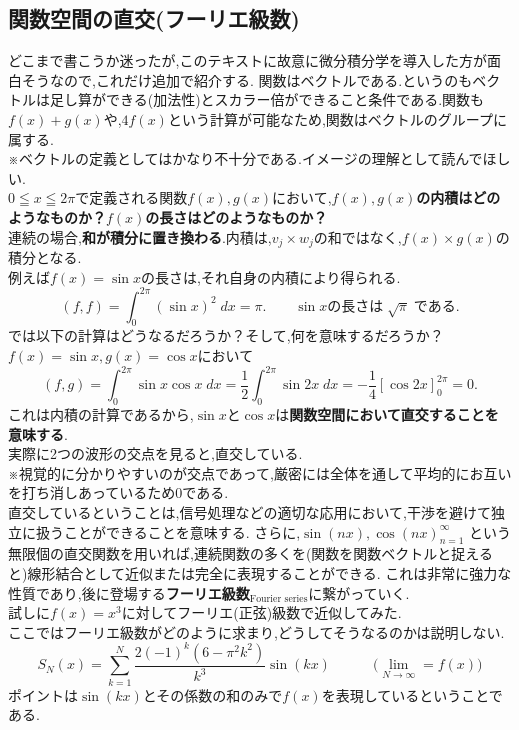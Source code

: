 \subsection{関数空間の直交(フーリエ級数)}
どこまで書こうか迷ったが,このテキストに故意に微分積分学を導入した方が面白そうなので,これだけ追加で紹介する.
関数はベクトルである.というのもベクトルは足し算ができる(加法性)とスカラー倍ができること条件である.関数も$f(x)+g(x)$や,$4f(x)$という計算が可能なため,関数はベクトルのグループに属する.\\
※ベクトルの定義としてはかなり不十分である.イメージの理解として読んでほしい.\\
$0\leqq x \leqq 2\pi$で定義される関数$f(x),g(x)$において,\textbf{$f(x),g(x)$の内積はどのようなものか？$f(x)$の長さはどのようなものか？}\\
連続の場合,\textbf{和が積分に置き換わる}.内積は,$v_j\times w_j$の和ではなく,$f(x)\times g(x)$の積分となる.\\
例えば$f(x)=\sin{x}$の長さは,それ自身の内積により得られる.
\[(f,f)=\int_{0}^{2\pi}(\sin{x})^2\;dx=\pi. \qquad\sin{x}\text{の長さは}\;\sqrt{\pi}\;\text{である.}\]
では以下の計算はどうなるだろうか？そして,何を意味するだろうか？\\
$f(x)=\sin{x},g(x)=\cos{x}$において
\[\displaystyle
(f,g)=\int_{0}^{2\pi}\sin{x}\cos{x}\;dx=\frac{1}{2}\int_{0}^{2\pi}\sin{2x}\;dx=-\frac{1}{4}\left[\cos{2x}\right]^{2\pi}_0=0.
\]
これは内積の計算であるから,$\sin{x}$と$\cos{x}$は\textbf{関数空間において直交することを意味する}.\\
実際に2つの波形の交点を見ると,直交している.\\
※視覚的に分かりやすいのが交点であって,厳密には全体を通して平均的にお互いを打ち消しあっているため0である.\\
直交しているということは,信号処理などの適切な応用において,干渉を避けて独立に扱うことができることを意味する.
さらに,${\sin(nx), \cos(nx)}_{n=1}^{\infty}$ という無限個の直交関数を用いれば,連続関数の多くを(関数を関数ベクトルと捉えると)線形結合として近似または完全に表現することができる.
これは非常に強力な性質であり,後に登場する\textbf{フーリエ級数}$_{\text{Fourier series}}$に繋がっていく.\\
試しに$f(x)=x^3$に対してフーリエ(正弦)級数で近似してみた.\\
ここではフーリエ級数がどのように求まり,どうしてそうなるのかは説明しない.
\[
S_N(x)=\sum_{k=1}^{N}\displaystyle \frac{2(-1)^k(6-\pi^2k^2)}{k^3}\sin(kx) \qquad \quad\Big(\lim_{N\to\infty}=f(x)\Big)\]
ポイントは$\sin(kx)$とその係数の和のみで$f(x)$を表現しているということである.
